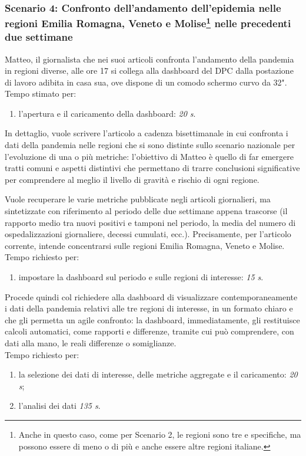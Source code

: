\subsubsection[Scenario 4: Confronto dell'andamento dell'epidemia nelle regioni Emilia Romagna, Veneto e Molise nelle precedenti due settimane]{Scenario 4: Confronto dell'andamento dell'epidemia nelle regioni Emilia Romagna, Veneto e Molise\footnote{Anche in questo caso, come per Scenario 2, le regioni sono tre e specifiche, ma possono essere di meno o di più e anche essere altre regioni italiane.} nelle precedenti due settimane}
Matteo, il giornalista che nei suoi articoli confronta l'andamento della pandemia in regioni diverse, alle ore 17 si collega alla dashboard del DPC dalla postazione di lavoro adibita in casa sua, ove dispone di un comodo schermo curvo da 32".\\
Tempo stimato per:
\begin{enumerate}
    \item l'apertura e il caricamento della dashboard: \textit{20 s}.
\end{enumerate}\noindent

In dettaglio, vuole scrivere l'articolo a cadenza bisettimanale in cui confronta i dati della pandemia nelle  regioni che si sono distinte sullo scenario nazionale per l'evoluzione di una o più metriche: l'obiettivo di Matteo è quello di far emergere tratti comuni e aspetti distintivi che permettano di trarre conclusioni significative per comprendere al meglio il livello di gravità e rischio di ogni regione.

Vuole recuperare le varie metriche pubblicate negli articoli giornalieri, ma sintetizzate con riferimento al periodo delle due settimane appena trascorse (il rapporto medio tra nuovi positivi e tamponi nel periodo, la media del numero di ospedalizzazioni giornaliere, decessi cumulati, ecc.).
Precisamente, per l'articolo corrente, intende concentrarsi sulle regioni Emilia Romagna, Veneto e Molise.\\
Tempo richiesto per:
\begin{enumerate}
    \item impostare la dashboard sul periodo e sulle regioni di interesse: \textit{15 s}.
\end{enumerate}\noindent

Procede quindi col richiedere alla dashboard di visualizzare contemporaneamente i dati della pandemia relativi alle tre regioni di interesse, in un formato chiaro e che gli permetta un agile confronto: la dashboard, immediatamente, gli restituisce calcoli automatici, come rapporti e differenze, tramite cui può comprendere, con dati alla mano, le reali differenze o somiglianze.\\
Tempo richiesto per:
\begin{enumerate}
    \item la selezione dei dati di interesse, delle metriche aggregate e il caricamento: \textit{20 s};
    \item l'analisi dei dati \textit{135 s}.
\end{enumerate}\noindent


